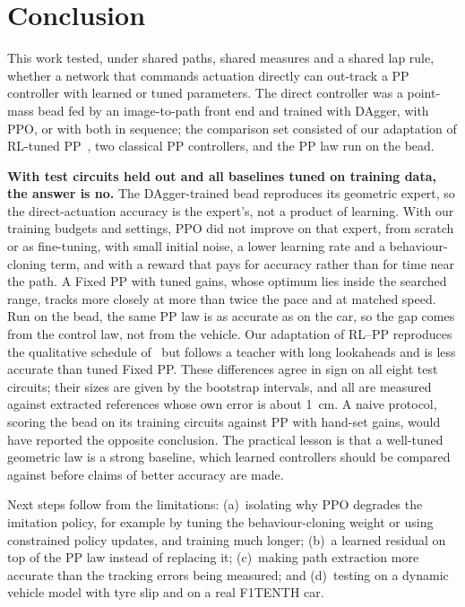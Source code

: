 \documentclass[conference]{IEEEtran}
\begin{document}
\section{Conclusion}
This work tested, under shared paths, shared measures and a shared lap rule, whether a network that commands actuation directly can out-track a PP controller with learned or tuned parameters. The direct controller was a point-mass bead fed by an image-to-path front end and trained with DAgger, with PPO, or with both in sequence; the comparison set consisted of our adaptation of RL-tuned PP~\cite{elgouhary2026}, two classical PP controllers, and the PP law run on the bead.

\textbf{With test circuits held out and all baselines tuned on training data, the answer is no.} The DAgger-trained bead reproduces its geometric expert, so the direct-actuation accuracy is the expert's, not a product of learning. With our training budgets and settings, PPO did not improve on that expert, from scratch or as fine-tuning, with small initial noise, a lower learning rate and a behaviour-cloning term, and with a reward that pays for accuracy rather than for time near the path. A Fixed PP with tuned gains, whose optimum lies inside the searched range, tracks more closely at more than twice the pace and at matched speed. Run on the bead, the same PP law is as accurate as on the car, so the gap comes from the control law, not from the vehicle. Our adaptation of RL--PP reproduces the qualitative schedule of~\cite{elgouhary2026} but follows a teacher with long lookaheads and is less accurate than tuned Fixed PP. These differences agree in sign on all eight test circuits; their sizes are given by the bootstrap intervals, and all are measured against extracted references whose own error is about 1~cm. A naive protocol, scoring the bead on its training circuits against PP with hand-set gains, would have reported the opposite conclusion. The practical lesson is that a well-tuned geometric law is a strong baseline, which learned controllers should be compared against before claims of better accuracy are made.

Next steps follow from the limitations: (a)~isolating why PPO degrades the imitation policy, for example by tuning the behaviour-cloning weight or using constrained policy updates, and training much longer; (b)~a learned residual on top of the PP law instead of replacing it; (c)~making path extraction more accurate than the tracking errors being measured; and (d)~testing on a dynamic vehicle model with tyre slip and on a real F1TENTH car.
\end{document}
